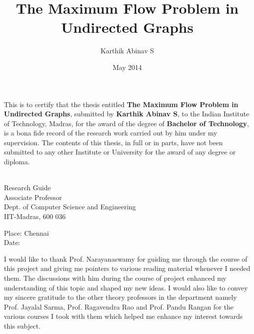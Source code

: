 \documentclass[BTech]{iitmdiss}
\def\thesistitle{The Maximum Flow Problem in Undirected Graphs}
\def\thesisauthor{Karthik Abinav S}
\begin{document}


\title{\thesistitle}

\author{\thesisauthor}

\date{May 2014}

\begin{singlespace}
\maketitle 
\end{singlespace} 


\newtheorem{thm}{Theorem}
\newtheorem{lemma}{Lemma}
\newtheorem{prop}{Proposition}
\newtheorem{modif}{Modification}
\newtheorem{defn}{Definition}

\certificate

\vspace*{0.5in}

\noindent This is to certify that the thesis entitled {\bf {\thesistitle}}, 
submitted by {\bf {\thesisauthor}}, to the Indian Institute of Technology, 
Madras, for the award of the degree of {\bf Bachelor of Technology}, 
is a bona fide record of the research work carried out by him under my
supervision. The contents of this thesis, in full or in parts, have not been
submitted to any other Institute or University for the award of any degree or
diploma.

\vspace*{1.4in}
\hspace*{-0.25in}
\begin{singlespace}
 \\
\noindent Research Guide \\ 
\noindent Associate Professor \\
\noindent Dept. of Computer Science and Engineering\\
\noindent IIT-Madras, 600 036 \\
\end{singlespace}
\vspace*{0.20in}
\noindent Place: Chennai\\ 
Date:

\acknowledgements

  I would like to thank Prof. Narayanaswamy for guiding me through the course of this project and giving me pointers to various reading material
  whenever I needed them. The discussions with him during the course of project enhanced my understanding of this topic and shaped my new ideas.
  I would also like to convey my sincere gratitude to the other theory professors in the department namely Prof. Jayalal Sarma, Prof. Ragavendra Rao and
  Prof. Pandu Rangan for the various courses I took with them which helped me enhance my interest towards this subject. \\
  
\end{document}
